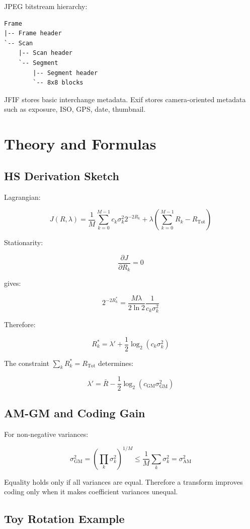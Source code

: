 JPEG bitstream hierarchy:

\begin{verbatim}
Frame
|-- Frame header
`-- Scan
    |-- Scan header
    `-- Segment
        |-- Segment header
        `-- 8x8 blocks
\end{verbatim}

JFIF stores basic interchange metadata. Exif stores camera-oriented metadata such as exposure, ISO, GPS, date, thumbnail.

\section{Theory and Formulas}

\subsection{HS Derivation Sketch}

Lagrangian:

\[
J(R,\lambda)
=
\frac{1}{M}\sum_{k=0}^{M-1}c_k\sigma_k^2 2^{-2R_k}
+
\lambda\left(\sum_{k=0}^{M-1}R_k-R_{\text{Tot}}\right)
\]

Stationarity:

\[
\frac{\partial J}{\partial R_k}=0
\]

gives:

\[
2^{-2R_k^*}
=
\frac{M\lambda}{2\ln2}
\frac{1}{c_k\sigma_k^2}
\]

Therefore:

\[
R_k^*
=
\lambda'
+
\frac{1}{2}\log_2(c_k\sigma_k^2)
\]

The constraint $\sum_kR_k^*=R_{\text{Tot}}$ determines:

\[
\lambda'
=
\bar{R}
-
\frac{1}{2}\log_2(c_{\text{GM}}\sigma_{\text{GM}}^2)
\]

\subsection{AM-GM and Coding Gain}

For non-negative variances:

\[
\sigma_{\text{GM}}^2
=
\left(\prod_k\sigma_k^2\right)^{1/M}
\leq
\frac{1}{M}\sum_k\sigma_k^2
=
\sigma_{\text{AM}}^2
\]

Equality holds only if all variances are equal. Therefore a transform improves coding only when it makes coefficient variances unequal.

\subsection{Toy Rotation Example}

